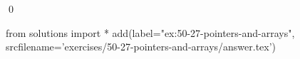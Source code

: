 
\begin{ex}
  \label{ex:50-27-pointers-and-arrays}
  
  \qed
\end{ex}
\begin{python0}
from solutions import *
add(label="ex:50-27-pointers-and-arrays",
    srcfilename='exercises/50-27-pointers-and-arrays/answer.tex')
\end{python0}
